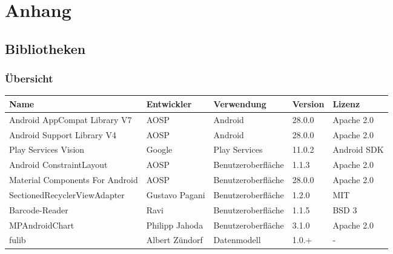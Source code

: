 \section{Anhang}\label{sec:bib}

\subsection{Bibliotheken}\label{subsec:bibliotheken}

\subsubsection{Übersicht} \label{subsubsec:libraries-overview}

\begin{tabularx}{\textwidth}{|X|l|l|l|l|}
    \hline
    \textbf{Name} & \textbf{Entwickler} & \textbf{Verwendung} & \textbf{Version} & \textbf{Lizenz} \\
    [0.5ex] \hline
    Android AppCompat Library V7 & AOSP & Android & 28.0.0 & Apache 2.0\\    %
    Android Support Library V4 & AOSP & Android & 28.0.0 & Apache 2.0\\   %
    \hline

    Play Services Vision & Google & Play Services & 11.0.2 & Android SDK\\  %
    \hline

    Android ConstraintLayout & AOSP & Benutzeroberfläche & 1.1.3 & Apache 2.0\\   %
    Material Components For Android & AOSP & Benutzeroberfläche & 28.0.0 & Apache 2.0\\  %
    SectionedRecyclerViewAdapter & Gustavo Pagani & Benutzeroberfläche & 1.2.0 & MIT\\   %
    Barcode-Reader & Ravi & Benutzeroberfläche & 1.1.5 & BSD 3\\   %
    MPAndroidChart & Philipp Jahoda & Benutzeroberfläche & 3.1.0 & Apache 2.0\\  %
    \hline

    fulib & Albert Zündorf & Datenmodell & 1.0.+ & -\\    %
    \hline


\end{tabularx}
